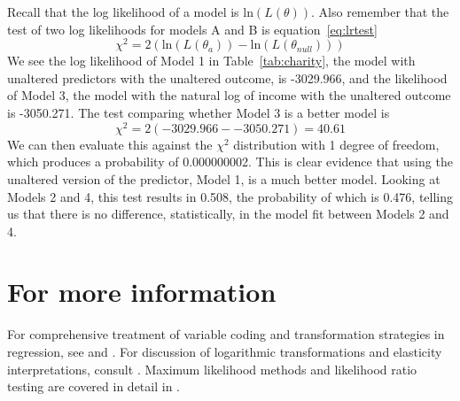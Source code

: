 Recall that the log likelihood of a model is $\mbox{ln}\left(L\left(\theta\right)\right)$. Also remember that the test of two log likelihoods for models A and B is equation~\eqref{eq:lrtest}
\[
\chi^2=2\left(\mbox{ln}\left(L\left(\theta_a\right)\right)-\mbox{ln}\left(L\left(\theta_{null}\right)\right)\right)
\]
We see the log likelihood of Model 1 in Table~\ref{tab:charity}, the model with unaltered predictors with the unaltered outcome, is -3029.966, and the likelihood of Model 3, the model with the natural log of income with the unaltered outcome is -3050.271. The test comparing whether Model 3 is a better model is
\[
\chi^2=2\left(-3029.966- -3050.271\right)=40.61
\]
We can then evaluate this against the $\chi^2$ distribution with 1 degree of freedom, which produces a probability of 0.000000002. This is clear evidence that using the unaltered version of the predictor, Model 1, is a much better model. Looking at Models 2 and 4, this test results in 0.508, the probability of which is 0.476, telling us that there is no difference, statistically, in the model fit between Models 2 and 4.

\section*{For more information}
For comprehensive treatment of variable coding and transformation strategies in regression, see \citep{fox} and \citep{hill}. For discussion of logarithmic transformations and elasticity interpretations, consult \citep{cameron2005microeconometrics}. Maximum likelihood methods and likelihood ratio testing are covered in detail in \citep{eliason1993maximum}.
